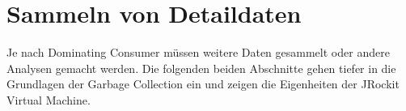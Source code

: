 \section{Sammeln von Detaildaten}
Je nach Dominating Consumer müssen weitere Daten gesammelt oder andere Analysen gemacht werden. Die folgenden beiden Abschnitte gehen tiefer in die Grundlagen der Garbage Collection ein und zeigen die Eigenheiten der JRockit Virtual Machine.


